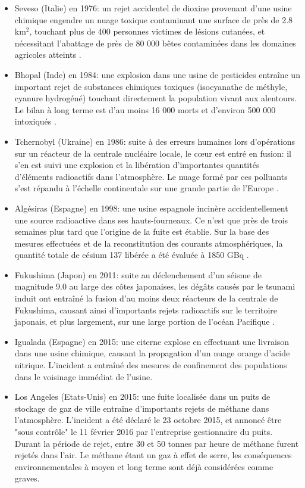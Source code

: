 	\begin{itemize}
		\item Seveso (Italie) en 1976: un rejet accidentel de dioxine provenant d'une usine chimique engendre un nuage toxique contaminant une surface de près de 2.8 km$^2$, touchant plus de 400 personnes victimes de lésions cutanées, et nécessitant l'abattage de près de 80 000 bêtes contaminées dans les domaines agricoles atteints \cite{Seveso1976}. 
		
		\item Bhopal (Inde) en 1984: une explosion dans une usine de pesticides entraîne un important rejet de substances chimiques toxiques (isocyanathe de méthyle, cyanure hydrogéné) touchant directement la population vivant aux alentours. Le bilan {à} long terme est d'au moins 16 000 morts et d'environ 500 000 intoxiqués \cite{Bhopal1984}.
		
		\item Tchernobyl (Ukraine) en 1986: suite à des erreurs humaines lors d'opérations sur un réacteur de la centrale nucléaire locale, le c\oe{}ur est entré en fusion: il s'en est suivi une explosion et la libération d'importantes quantités d'éléments radioactifs dans l'atmosphère. Le nuage formé par ces polluants s'est répandu à l'échelle continentale sur une grande partie de l'Europe \cite{Repussard2006}.
		
		\item Algésiras (Espagne) en 1998: une usine espagnole incinère accidentellement une source radioactive dans ses hauts-fourneaux. Ce n'est que près de trois semaines plus tard que l'origine de la fuite est établie. Sur la base des mesures effectuées et de la reconstitution des courants atmosphériques, la quantité totale de césium 137 libérée a été évaluée à 1850 GBq \cite{Estevan2003}.
		
		\item Fukushima (Japon) en 2011: suite au déclenchement d'un séisme de magnitude 9.0 au large des côtes japonaises, les dégâts causés par le tsunami induit ont entraîné la fusion d'au moins deux réacteurs de la centrale de Fukushima, causant ainsi d'importants rejets radioactifs sur le territoire japonais, et plus largement, sur une large portion de l'océan Pacifique \cite{IRSN2012}.
		
		\item Igualada (Espagne) en 2015: une citerne explose en effectuant une livraison dans une usine chimique, causant la propagation d'un nuage orange d'acide nitrique. L'incident a entraîné des mesures de confinement des populations dans le voisinage immédiat de l'usine.
		\item Los Angeles (Etats-Unis) en 2015: une fuite localisée dans un puits de stockage de gaz de ville entraîne d'importants rejets de méthane dans l'atmosphère. L'incident a été déclaré le 23 octobre 2015, et annoncé être "sous contrôle" le 11 février 2016 par l'entreprise gestionnaire du puits. Durant la période de rejet, entre 30 et 50 tonnes par heure de méthane furent rejetés dans l'air. Le méthane étant un gaz à effet de serre, les conséquences environnementales à moyen et long terme sont déjà considérées comme graves.\\
	\end{itemize}
	
